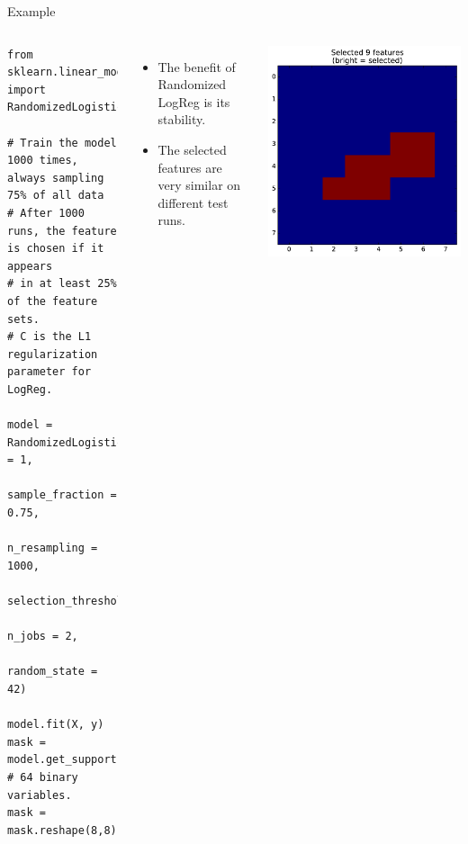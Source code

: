 \documentclass[10pt, aspectratio=169]{beamer} %
\begin{document}
\begin{frame}[fragile]{Example}
\begin{columns}[onlytextwidth]
\begin{lstlisting}
from sklearn.linear_model import RandomizedLogisticRegression

# Train the model 1000 times, always sampling 75% of all data
# After 1000 runs, the feature is chosen if it appears
# in at least 25% of the feature sets.
# C is the L1 regularization parameter for LogReg.

model = RandomizedLogisticRegression(C = 1, 
                                     sample_fraction = 0.75,
                                     n_resampling = 1000,
                                     selection_threshold=0.25,
                                     n_jobs = 2,
                                     random_state = 42)
                        
model.fit(X, y)
mask = model.get_support() # 64 binary variables.
mask = mask.reshape(8,8) 
\end{lstlisting}
\begin{itemize}
\item The benefit of Randomized LogReg is its stability.
\item The selected features are very similar on different test runs.
\end{itemize}
\begin{center}
\includegraphics[width=0.7\columnwidth]{Stability_selection_digits_mask.pdf}
\end{center}
\end{columns}
\end{frame}
\end{document}
